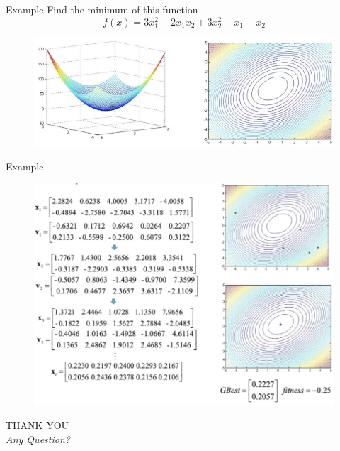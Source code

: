 \documentclass[pdflatex,compress,mathserif]{beamer}
\begin{document}
\begin{frame}{Example}
	Find the minimum of this function
	$$f(x) = 3x_1^2 - 2x_1x_2 + 3x_2^2 - x_1 - x_2$$
	\begin{figure}
		\centering
		\includegraphics[width=\linewidth]{img/15}
	\end{figure}
\end{frame}

\begin{frame}{Example}
	\begin{figure}
		\centering
		\includegraphics[width=\linewidth]{img/16}
	\end{figure}
\end{frame}

\begin{frame}
	\centering
	\LARGE{THANK YOU\\}
	\vspace{0.5cm}
	\large{\emph{Any Question?}}
\end{frame}
\end{document}
